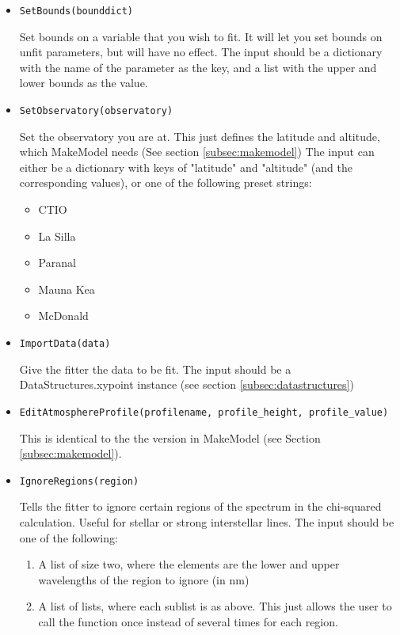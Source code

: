 \documentclass{article}
\begin{document}
\begin{itemize}
  \item \begin{Verbatim}[commandchars=\\\{\}]
SetBounds(bounddict)
    \end{Verbatim}
    Set bounds on a variable that you wish to fit. It will let you set bounds on unfit parameters, but will have no effect. The input should be a dictionary with the name of the parameter as the key, and a list with the upper and lower bounds as the value.
    
  \item \begin{Verbatim}[commandchars=\\\{\}]
SetObservatory(observatory)
    \end{Verbatim}
    Set the observatory you are at. This just defines the latitude and altitude, which MakeModel needs (See section \ref{subsec:makemodel})
    The input can either be a dictionary with keys of "latitude" and "altitude" (and the corresponding values), or one of the following preset strings:
    \begin{itemize}
      \item CTIO
      \item La Silla
      \item Paranal
      \item Mauna Kea
      \item McDonald
    \end{itemize}
    
  \item \begin{Verbatim}[commandchars=\\\{\}]
ImportData(data)
    \end{Verbatim}
    Give the fitter the data to be fit. The input should be a DataStructures.xypoint instance (see section \ref{subsec:datastructures})
  
  \item \begin{Verbatim}[commandchars=\\\{\}]
EditAtmosphereProfile(profilename, profile_height, profile_value)
    \end{Verbatim}
    This is identical to the the version in MakeModel (see Section \ref{subsec:makemodel}).
    
  \item \begin{Verbatim}[commandchars=\\\{\}]
IgnoreRegions(region)
    \end{Verbatim}
    Tells the fitter to ignore certain regions of the spectrum in the chi-squared calculation. Useful for stellar or strong interstellar lines. The input should be one of the following:
    \begin{enumerate}
    \item A list of size two, where the elements are the lower and upper wavelengths of the region to ignore (in nm)
    \item A list of lists, where each sublist is as above. This just allows the user to call the function once instead of several times for each region.
    \end{enumerate}
    

\end{itemize}
\end{document}

